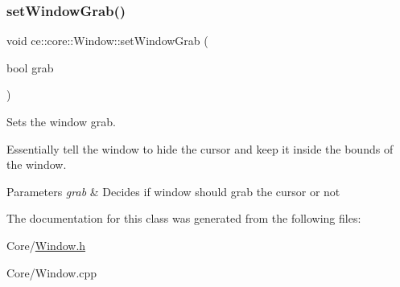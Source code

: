\subsubsection{\texorpdfstring{set\+Window\+Grab()}{setWindowGrab()}}
{\footnotesize\ttfamily void ce\+::core\+::\+Window\+::set\+Window\+Grab (\begin{DoxyParamCaption}\item[{bool}]{grab }\end{DoxyParamCaption})}



Sets the window grab. 

Essentially tell the window to hide the cursor and keep it inside the bounds of the window.


\begin{DoxyParams}{Parameters}
{\em grab} & Decides if window should grab the cursor or not \\
\hline
\end{DoxyParams}


The documentation for this class was generated from the following files\+:\begin{DoxyCompactItemize}
\item 
Core/\hyperlink{_window_8h}{Window.\+h}\item 
Core/Window.\+cpp\end{DoxyCompactItemize}
